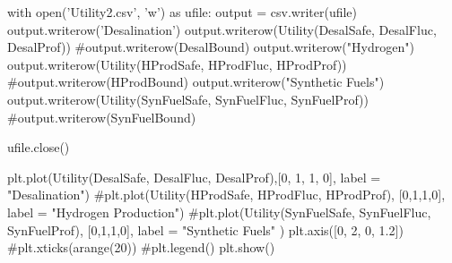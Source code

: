 \documentclass[12pt]{UIdahoMastersThesis}
\begin{document}
with open('Utility2.csv', 'w') as ufile:
    output = csv.writer(ufile)
    output.writerow('Desalination')
    output.writerow(Utility(DesalSafe, DesalFluc, DesalProf))
    \#output.writerow(DesalBound)
    output.writerow("Hydrogen")
    output.writerow(Utility(HProdSafe, HProdFluc, HProdProf))
    \#output.writerow(HProdBound)
    output.writerow("Synthetic Fuels")
    output.writerow(Utility(SynFuelSafe, SynFuelFluc, SynFuelProf))
    \#output.writerow(SynFuelBound)

ufile.close()


plt.plot(Utility(DesalSafe, DesalFluc, DesalProf),[0, 1, 1, 0], label = "Desalination")
\#plt.plot(Utility(HProdSafe, HProdFluc, HProdProf), [0,1,1,0], label = "Hydrogen Production")
\#plt.plot(Utility(SynFuelSafe, SynFuelFluc, SynFuelProf), [0,1,1,0], label = "Synthetic Fuels" )
plt.axis([0, 2, 0, 1.2])
\#plt.xticks(arange(20))
\#plt.legend()
plt.show()


% 

% 
\end{document}
